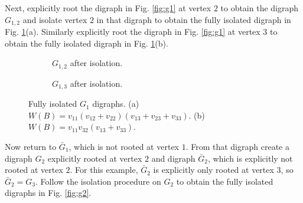 \documentclass[review,supplement,hidelinks,onefignum,onetabnum]{siamart220329}
\begin{document}
Next, explicitly root the digraph in Fig. \ref{fig:g1} at vertex $2$ to obtain the digraph $G_{1,2}$ and isolate vertex $2$ in that digraph to obtain the fully isolated digraph in Fig. \ref{fig:g1_23}(a).  Similarly explicitly root the digraph in Fig. \ref{fig:g1} at vertex $3$ to obtain the fully isolated digraph in Fig. \ref{fig:g1_23}(b).

\begin{figure}[htb!]
\centering 
  \begin{subfigure}[b]{0.25\textwidth}
  \centering
    \caption{$G_{1,2}$ after isolation.}  
  \end{subfigure} 
  \hspace{6em}
  \begin{subfigure}[b]{0.25\textwidth}
  \centering
    \caption{$G_{1,3}$ after isolation.}
    \end{subfigure}

    \caption{Fully isolated $G_1$ digraphs.  (a) $W(B) = v_{11}(v_{12}+v_{22})(v_{13}+v_{23}+v_{33})$. (b) $W(B) = v_{11}v_{32}(v_{13}+v_{33})$.}
\label{fig:g1_23}
\end{figure}

Now return to ${\bar G}_1$, which is not rooted at vertex $1$.  From that digraph create a digraph $G_2$ explicitly rooted at vertex $2$ and digraph ${\bar G}_2$, which is explicitly not rooted at vertex $2$.  For this example, ${\bar G}_2$ is explicitly only rooted at vertex $3$, so ${\bar G}_2 = G_3$.  Follow the isolation procedure on $G_2$ to obtain the fully isolated digraphs in Fig. \ref{fig:g2}.
\end{document}
